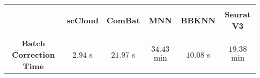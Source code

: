\documentclass{article}
\begin{document}
\begin{center}
\begin{tabular}{|c|c|c|c|c|c|}\hline
& & & & & \\[-10pt]
 & \textbf{scCloud} & \textbf{ComBat} & \textbf{MNN} & \textbf{BBKNN} & \textbf{Seurat V3}\\[2pt]\hline
 & & & & & \\[-10pt]
 \textbf{Batch Correction Time} & $2.94$ s & $21.97$ s & $34.43$ min & $10.08$ s & $19.38$ min  \\[2pt]\hline
\end{tabular}
\end{center}
\end{document}
